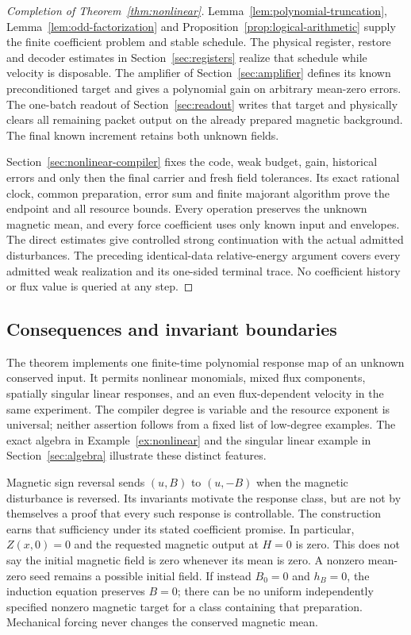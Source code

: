 \documentclass[11pt,a4paper]{amsart}
\theoremstyle{definition}
\theoremstyle{remark}
\numberwithin{equation}{section}
\begin{document}
\begin{proof}[Completion of Theorem~\ref{thm:nonlinear}]
Lemma~\ref{lem:polynomial-truncation}, Lemma~\ref{lem:odd-factorization} and
Proposition~\ref{prop:logical-arithmetic} supply the finite coefficient
problem and stable schedule. The physical register, restore and decoder
estimates in Section~\ref{sec:registers} realize that schedule while velocity
is disposable. The amplifier of Section~\ref{sec:amplifier} defines its known
preconditioned target and gives a polynomial gain on arbitrary mean-zero
errors. The one-batch readout of Section~\ref{sec:readout} writes that target
and physically clears all remaining packet output on the already prepared
magnetic background. The final known increment retains both unknown fields.

Section~\ref{sec:nonlinear-compiler} fixes the code, weak budget, gain,
historical errors and only then the final carrier and fresh field tolerances.
Its exact rational clock, common preparation, error sum and finite majorant
algorithm prove the endpoint and all resource bounds. Every operation
preserves the unknown magnetic mean, and every force coefficient uses only
known input and envelopes. The direct estimates give controlled strong
continuation with the actual admitted disturbances. The preceding
identical-data relative-energy argument covers every admitted weak
realization and its one-sided terminal trace. No coefficient history or
flux value is queried at any step.
\end{proof}

\subsection{Consequences and invariant boundaries}
The theorem implements one finite-time polynomial response map of an unknown
conserved input. It permits nonlinear monomials, mixed flux components,
spatially singular linear responses, and an even flux-dependent velocity in
the same experiment. The compiler degree is variable and the resource
exponent is universal; neither assertion follows from a fixed list of
low-degree examples. The exact algebra in Example~\ref{ex:nonlinear} and
the singular linear example in Section~\ref{sec:algebra} illustrate these
distinct features.

Magnetic sign reversal sends $(u,B)$ to $(u,-B)$ when the magnetic
disturbance is reversed. Its invariants motivate the response class, but
are not by themselves a proof that every such response is controllable.
The construction earns that sufficiency under its stated coefficient promise.
In particular, $Z(x,0)=0$ and the requested magnetic output at $H=0$ is
zero. This does not say the initial magnetic field is zero whenever its
mean is zero. A nonzero mean-zero seed remains a possible initial field.
If instead $B_0=0$ and $h_B=0$, the induction equation preserves $B=0$;
there can be no uniform independently specified nonzero magnetic target
for a class containing that preparation. Mechanical forcing never changes
the conserved magnetic mean.
\end{document}
